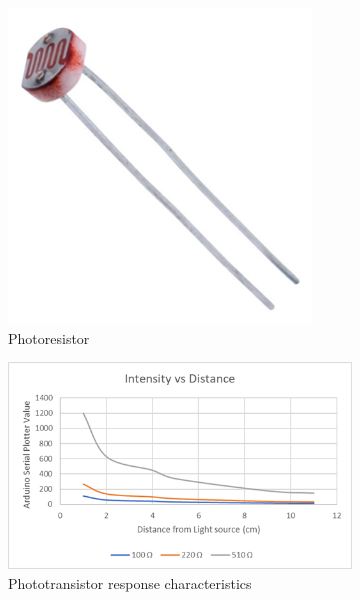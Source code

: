 
\begin{figure}
    \centering
    \begin{subfigure}[b]{.2\linewidth}
        \includegraphics[width=\linewidth]{images/photoresistor.png}
        \caption{Photoresistor}
    \end{subfigure}
    \hspace{2cm}
    \begin{subfigure}[b]{.4\linewidth}
        \includegraphics[width=\linewidth]{images/ldr-graph.png}
        \caption{Phototransistor response characteristics}
    \end{subfigure}
    \caption{}
\end{figure}


